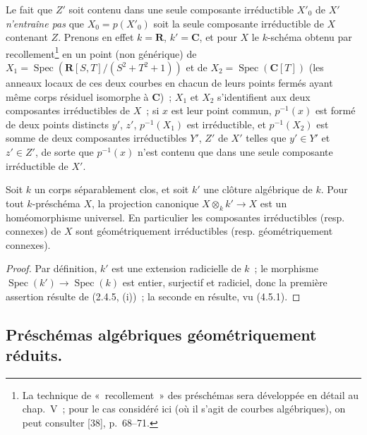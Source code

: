 \begin{remark}[4.5.20]
\label{IV.2.4.5.20-fr}
Le fait que $Z'$ soit contenu dans une seule composante irréductible $X'_0$ de
$X'$ \emph{n'entraîne pas} que $X_0=p(X'_0)$ soit la seule composante
irréductible de $X$ contenant $Z$. Prenons en effet $k=\mathbf R$,
$k'=\mathbf C$, et pour $X$ le $k$-schéma obtenu par recollement\footnote{La
technique de «~recollement~» des préschémas sera développée en détail au
chap.~V~; pour le cas considéré ici (où il s'agit de courbes algébriques), on
peut consulter [38], p.~68--71.} en un point (non générique) de
$X_1=\operatorname{Spec}(\mathbf R[S,T]/(S^2+T^2+1))$ et de
$X_2=\operatorname{Spec}(\mathbf C[T])$ (les anneaux locaux de ces deux courbes
en chacun de leurs points fermés ayant même corps résiduel isomorphe à
$\mathbf C$)~; $X_1$ et $X_2$ s'identifient aux deux composantes irréductibles
de $X$~; si $x$ est leur point commun, $p^{-1}(x)$ est formé de deux points
distincts $y'$, $z'$, $p^{-1}(X_1)$ est irréductible, et $p^{-1}(X_2)$ est somme
de deux composantes irréductibles $Y'$, $Z'$ de $X'$ telles que $y'\in Y'$ et
$z'\in Z'$, de sorte que $p^{-1}(x)$ n'est contenu que dans une seule
composante irréductible de $X'$.
\end{remark}

\begin{proposition}[4.5.21]
\label{IV.2.4.5.21-fr}
Soit $k$ un corps séparablement clos, et soit $k'$ une clôture algébrique de
$k$. Pour tout $k$-préschéma $X$, la projection canonique
$X\otimes_k k'\to X$ est un homéomorphisme universel.
En particulier les composantes irréductibles \textup{(resp.} connexes\textup{)} de $X$ sont
géométriquement irréductibles \textup{(resp.} géométriquement connexes\textup{)}.
\end{proposition}

\begin{proof}
Par définition, $k'$ est une extension radicielle de $k$~; le morphisme
$\operatorname{Spec}(k')\to\operatorname{Spec}(k)$ est entier, surjectif et
radiciel, donc la première assertion résulte de (2.4.5, (i))~; la seconde en
résulte, vu (4.5.1).
\end{proof}

\subsection{Préschémas algébriques géométriquement réduits.}
\label{subsection:IV.2.4.6-fr}


